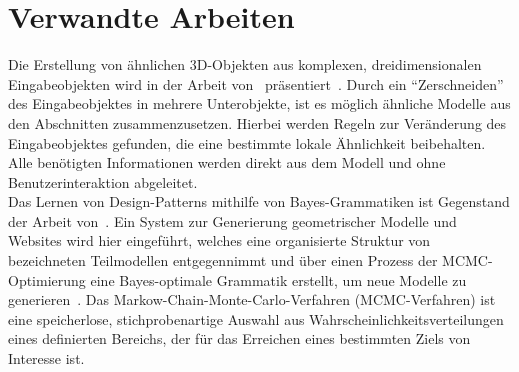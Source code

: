 \section{Verwandte Arbeiten}
Die Erstellung von ähnlichen 3D-Objekten aus komplexen, dreidimensionalen Eingabeobjekten wird in der Arbeit von~\citeauthor{bokeloh_2010}
präsentiert~\cite{bokeloh_2010}.
Durch ein "`Zerschneiden"' des Eingabeobjektes in mehrere Unterobjekte, ist es möglich ähnliche Modelle aus den
Abschnitten zusammenzusetzen.
Hierbei werden Regeln zur Veränderung des Eingabeobjektes gefunden, die eine bestimmte lokale Ähnlichkeit beibehalten.
Alle benötigten Informationen werden direkt aus dem Modell und ohne Benutzerinteraktion abgeleitet.\\
Das Lernen von Design-Patterns mithilfe von Bayes-Grammatiken ist Gegenstand der Arbeit von~\citeauthor{talton_2012}.
Ein System zur Generierung geometrischer Modelle und Websites wird hier eingeführt, welches eine organisierte
Struktur von bezeichneten Teilmodellen entgegennimmt und über einen Prozess der MCMC-Optimierung eine Bayes-optimale
Grammatik erstellt, um neue Modelle zu generieren~\cite{talton_2012}.
Das Markow-Chain-Monte-Carlo-Verfahren (MCMC-Verfahren) ist eine speicherlose, stichprobenartige Auswahl aus
Wahrscheinlichkeitsverteilungen eines definierten Bereichs, der für das Erreichen eines bestimmten Ziels von
Interesse ist.

\newpage

